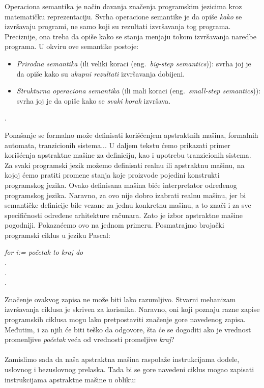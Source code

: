 \documentclass[a4paper]{article}
\begin{document}
{\qquad Operaciona semantika je način davanja značenja programskim jezicima kroz matematičku reprezentaciju. Svrha operacione semantike je da opiše \textit{kako} se izvršavaju programi, ne samo koji su rezultati izvršavanja tog programa. Preciznije, ona treba da opiše kako se stanja menjaju tokom izvršavanja naredbe programa. U okviru ove semantike postoje:
\begin{itemize}
	\item \textit{Prirodna semantika} (ili veliki koraci (eng.~{\em big-step semantics})): svrha joj je da opiše kako su \textit{ukupni rezultati} izvršavanja dobijeni.
	\item \textit{Strukturna operaciona semantika} (ili mali koraci (eng.~{\em small-step semantics})): svrha joj je da opiše kako se \textit{svaki korak} izvršava.
\end{itemize} \cite{wiley}.

Ponašanje se formalno može definisati korišćenjem apstraktnih mašina, formalnih automata, tranzicionih sistema... U daljem tekstu ćemo prikazati primer korišćenja apstraktne mašine za definiciju, kao i upotrebu tranzicionih sistema.\\

Za svaki programski jezik možemo definisati realnu ili apstraktnu mašinu, na kojoj ćemo pratiti promene stanja koje proizvode pojedini konstrukti programskog jezika. Ovako definisana mašina biće interpretator određenog programskog jezika. Naravno, za ovo nije dobro izabrati realnu mašinu, jer bi semantičke definicije bile vezane za jednu konkretnu mašinu, a to znači i za sve specifičnosti određene arhitekture računara. Zato je izbor apstraktne mašine pogodniji. Pokazaćemo ovo na jednom primeru. Posmatrajmo brojački programski ciklus u jeziku Pascal:\\

\begin{center}\textit{for i:= početak to kraj do}
\\.
\\.
\\.
\end{center}
\hfill \break
Značenje ovakvog zapisa ne može biti lako razumljivo. Stvarni mehanizam izvršavanja ciklusa je skriven za korisnika. Naravno, oni koji poznaju razne zapise programskih ciklusa mogu lako pretpostaviti značenje gore navedenog zapisa. Međutim, i za njih će biti teško da odgovore, šta će se dogoditi ako je vrednost promenljive \textit{početak} veća od vrednosti promeljive \textit{kraj}?\\
\\Zamislimo sada da naša apstraktna mašina raspolaže instrukcijama dodele, uslovnog i bezuslovnog prelaska. Tada bi se gore navedeni ciklus mogao zapisati instrukcijama apstraktne mašine u obliku:\\

}
\end{document}
